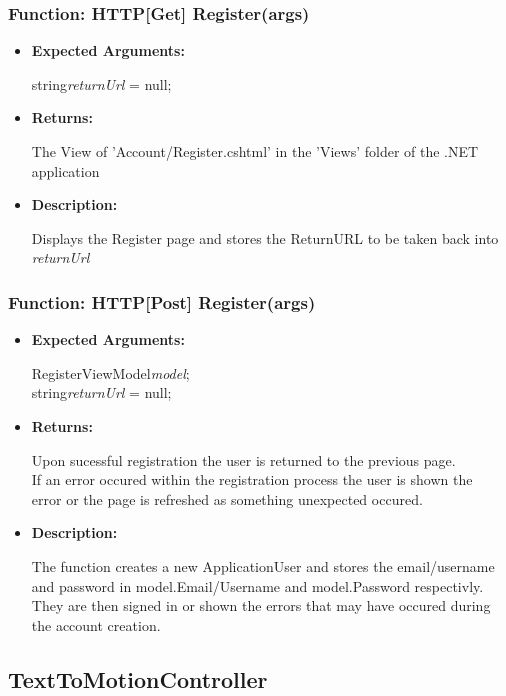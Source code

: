 \documentclass{scrreprt}
\begin{document}
\subsubsection{Function: HTTP[Get] Register(args)}
\begin{itemize}
    \item \textbf{Expected Arguments:}

    string\quad\textit{returnUrl} = null;

    \item \textbf{Returns:}

    The View of 'Account/Register.cshtml' in the 'Views' folder of the .NET application

    \item \textbf{Description:}

    Displays the Register page and stores the ReturnURL to be taken back into \textit{returnUrl}
\end{itemize}


\subsubsection{Function: HTTP[Post] Register(args)}
\begin{itemize}
    \item \textbf{Expected Arguments:}

    RegisterViewModel\quad\textit{model};
    \\
    string\quad\textit{returnUrl} = null;

    \item \textbf{Returns:}

    Upon sucessful registration the user is returned to the previous page.
    \\
    If an error occured within the registration process the user is shown the
    \\
    error or the page is refreshed as something unexpected occured.

    \item \textbf{Description:}

    The function creates a new ApplicationUser and stores the email/username and password in model.Email/Username and model.Password respectivly. They are then signed in or shown the errors that may have occured during the account creation.
\end{itemize}


\subsection{TextToMotionController}
\end{document}
